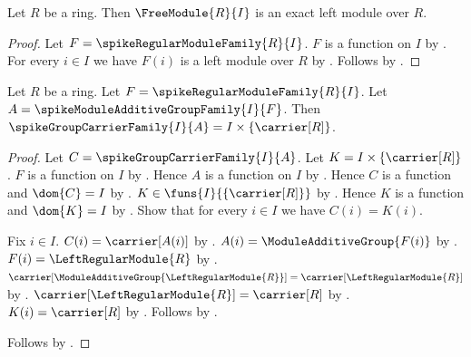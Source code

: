 \begin{theorem}\label{spike_free_module_is_exact}
    Let $R$ be a ring.
    Then $\FreeModule{R}{I}$ is an exact left module over $R$.
\end{theorem}
\begin{proof}
    Let $F=\spikeRegularModuleFamily{R}{I}$.
    $F$ is a function on $I$ by
        .
    For every $i\in I$ we have $F(i)$ is a left module over $R$ by
        .
    Follows by
        .
\end{proof}

\begin{proposition}\label{spike_free_module_carrier_family}
    Let $R$ be a ring.
    Let $F=\spikeRegularModuleFamily{R}{I}$.
    Let $A=\spikeModuleAdditiveGroupFamily{I}{F}$.
    Then
        $\spikeGroupCarrierFamily{I}{A}
            =I\times\{\carrier[R]\}$.
\end{proposition}
\begin{proof}
    Let $C=\spikeGroupCarrierFamily{I}{A}$.
    Let $K=I\times\{\carrier[R]\}$.
    $F$ is a function on $I$ by
        .
    Hence $A$ is a function on $I$ by
        .
    Hence $C$ is a function and $\dom{C}=I$ by
        .
    $K\in\funs{I}{\{\carrier[R]\}}$ by
        .
    Hence $K$ is a function and $\dom{K}=I$ by
        .
    Show that for every $i\in I$ we have $C(i)=K(i)$.
    \begin{subproof}
        Fix $i\in I$.
        $C(i)=\carrier[A(i)]$ by
            .
        $A(i)=\ModuleAdditiveGroup{F(i)}$ by
            .
        $F(i)=\LeftRegularModule{R}$ by
            .
        $\carrier[\ModuleAdditiveGroup{\LeftRegularModule{R}}]
            =\carrier[\LeftRegularModule{R}]$ by
            .
        $\carrier[\LeftRegularModule{R}]=\carrier[R]$ by
            .
        $K(i)=\carrier[R]$ by .
        Follows by \auto.
    \end{subproof}
    Follows by .
\end{proof}

